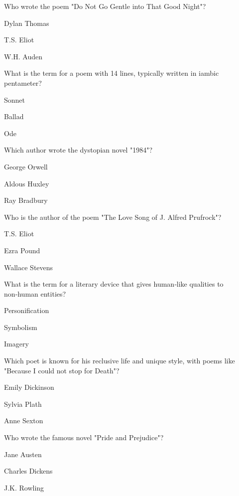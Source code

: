 \begin{enhancedmcq}{Who wrote the poem "Do Not Go Gentle into That Good Night"?}
\item Dylan Thomas
\item T.S. Eliot
\item W.H. Auden

\end{enhancedmcq}
\begin{enhancedmcq}{What is the term for a poem with 14 lines, typically written in iambic pentameter?}
\item Sonnet
\item Ballad
\item Ode

\end{enhancedmcq}
\begin{enhancedmcq}{Which author wrote the dystopian novel "1984"?}
\item George Orwell
\item Aldous Huxley
\item Ray Bradbury

\end{enhancedmcq}
\begin{enhancedmcq}{Who is the author of the poem "The Love Song of J. Alfred Prufrock"?}
\item T.S. Eliot
\item Ezra Pound
\item Wallace Stevens

\end{enhancedmcq}
\begin{enhancedmcq}{What is the term for a literary device that gives human‑like qualities to non‑human entities?}
\item Personification
\item Symbolism
\item Imagery

\end{enhancedmcq}
\begin{enhancedmcq}{Which poet is known for his reclusive life and unique style, with poems like "Because I could not stop for Death"?}
\item Emily Dickinson
\item Sylvia Plath
\item Anne Sexton

\end{enhancedmcq}
\begin{enhancedmcq}{Who wrote the famous novel "Pride and Prejudice"?}
\item Jane Austen
\item Charles Dickens
\item J.K. Rowling

\end{enhancedmcq}
